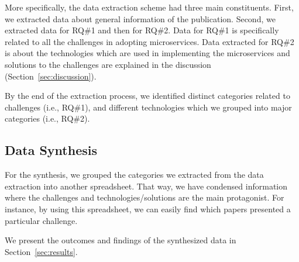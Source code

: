 More specifically, the data extraction scheme had three main constituents. First, we extracted data about general information of the publication. Second, we extracted data for RQ\#1 and then for RQ\#2. Data for RQ\#1 is specifically related to all the challenges in adopting microservices. Data extracted for RQ\#2 is about the technologies which are used in implementing the microservices and solutions to the challenges are explained in the discussion (Section~\ref{sec:discussion}).

By the end of the extraction process, we identified \challengecount distinct categories related to challenges (i.e., RQ\#1), and \techcount different technologies which we grouped into \techgroupcount major categories (i.e., RQ\#2). 


\subsection{Data Synthesis}


For the synthesis, we grouped the categories we extracted from the data extraction into another spreadsheet. That way, we have condensed information where the challenges and technologies/solutions are the main protagonist. For instance, by using this spreadsheet, we can easily find which papers presented a particular challenge. 

We present the outcomes and findings of the synthesized data in Section~\ref{sec:results}.


